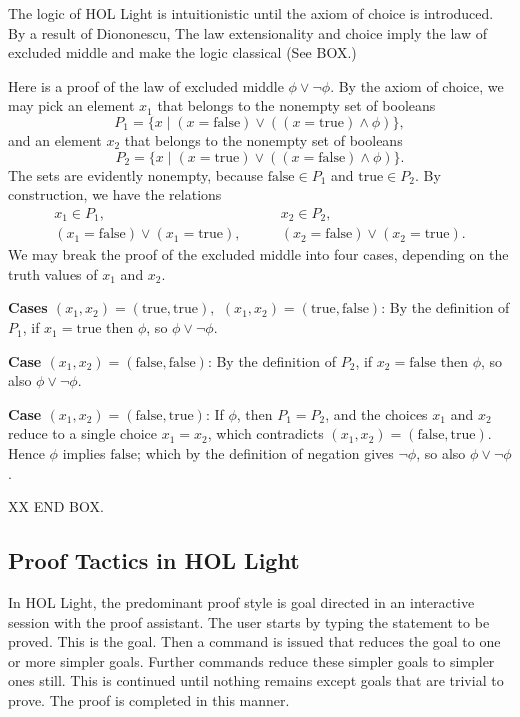 \documentclass{llncs}
\def\true{\text{true}}
\def\false{\text{false}}
\begin{document}
The logic of HOL Light is intuitionistic until the axiom of choice is
introduced.  By a result of Diononescu, The law extensionality and
choice imply the law of excluded middle and make the logic classical
(See BOX.) \cite{Bee85}

Here is a proof of the law of excluded middle $\phi\lor \lnot\phi$.
By the axiom of choice, we may pick an element $x_1$ that belongs to
the nonempty set of booleans
\[
P_1 = \{ x \mid (x = \text{false}) \lor ((x = \text{true}) \land \phi)\},
\]
and an element $x_2$ that belongs to the nonempty set of booleans
\[
P_2  = \{x \mid (x = \text{true}) \lor ((x = \text{false}) \land \phi)\}.
\]
The sets are evidently nonempty, because $\false\in P_1$ and $\true\in P_2$.
By construction, we have the relations
\begin{align*}
x_1\in P_1,&\qquad x_2\in P_2,\\
(x_1=\text{false})\lor (x_1 = \text{true}), &\qquad (x_2=\text{false})\lor (x_2 = \text{true}). 
\end{align*}
We may break the proof of the excluded middle into four cases, depending on the
truth values of $x_1$ and $x_2$.

{\bf Cases $(x_1,x_2)=(\true,\true),$ $(x_1,x_2)=(\true,\false)$}: By
the definition of $P_1$, if $x_1 = \true$ then $\phi$, so $\phi\lor
\lnot\phi$. 

 {\bf Case $(x_1,x_2)=(\false,\false)$}: By the definition
of $P_2$, if $x_2=\false$ then $\phi$, so also $\phi\lor\lnot\phi$.

{\bf Case $(x_1,x_2)=(\false,\true)$}: If $\phi$, then $P_1=P_2$, and
the choices $x_1$ and $x_2$ reduce to a single choice $x_1=x_2$, which
contradicts $(x_1,x_2)=(\false,\true)$.  Hence $\phi$ implies
$\false$; which by the definition of negation gives $\lnot\phi$, so
also $\phi\lor\lnot\phi$.

XX END BOX.



\subsection{Proof Tactics in HOL Light}

In HOL Light, the predominant proof style is goal directed in an
interactive session with the proof assistant.  The user starts by
typing the statement to be proved.  This is the goal.  Then a command
is issued that reduces the goal to one or more simpler goals.  Further
commands reduce these simpler goals to simpler ones still.  This is
continued until nothing remains except goals that are trivial to
prove.  The proof is completed in this manner.
\end{document}
